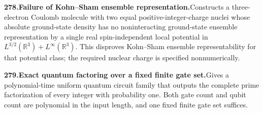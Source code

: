 \documentclass[11pt,a4paper]{article}
\begin{document}
  \par \begin{minipage}{\linewidth}
  \fontsize{10.5}{12.6}\selectfont\RaggedRight
  \hypertarget{result 278}{}
  {\bfseries\textcolor{muted}{278.}\enspace Failure of Kohn--Sham ensemble representation.}\enspace Constructs a three-electron Coulomb molecule with two equal positive-integer-charge nuclei whose absolute ground-state density has no noninteracting ground-state ensemble representation by a single real spin-independent local potential in $L^{3/2}(\mathbb R^3)+L^\infty(\mathbb R^3)$. This disproves Kohn--Sham ensemble representability for that potential class; the required nuclear charge is specified nonnumerically.\par
  \end{minipage}\par\vspace{5pt}



  \par \begin{minipage}{\linewidth}
  \fontsize{10.5}{12.6}\selectfont\RaggedRight
  \hypertarget{result 279}{}
  {\bfseries\textcolor{muted}{279.}\enspace Exact quantum factoring over a fixed finite gate set.}\enspace Gives a polynomial-time uniform quantum circuit family that outputs the complete prime factorization of every integer with probability one. Both gate count and qubit count are polynomial in the input length, and one fixed finite gate set suffices.\par
  \end{minipage}\par\vspace{5pt}
\end{document}
